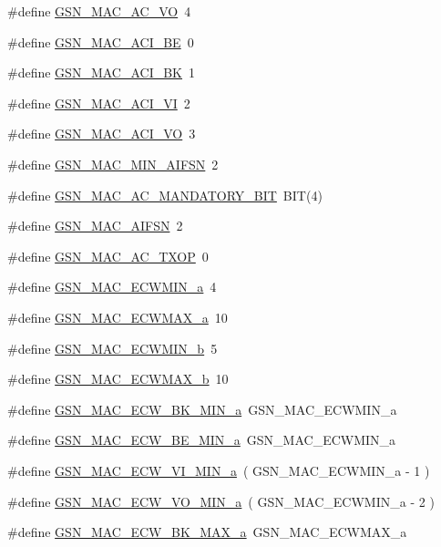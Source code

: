 \begin{DoxyCompactItemize}
\item 
\#define \hyperlink{a00523_a4de3fa81752356dc23b5990b02a54513}{GSN\_\-MAC\_\-AC\_\-VO}~4
\item 
\#define \hyperlink{a00523_a883b55372dade601837db81c6f59bdd7}{GSN\_\-MAC\_\-ACI\_\-BE}~0
\item 
\#define \hyperlink{a00523_a97a58aa6ea6e5a9bed57639a304055c0}{GSN\_\-MAC\_\-ACI\_\-BK}~1
\item 
\#define \hyperlink{a00523_a532c477c2671eb5baf4b3bbdf44ed128}{GSN\_\-MAC\_\-ACI\_\-VI}~2
\item 
\#define \hyperlink{a00523_a432cc7cfe39a06339138bb0c2ee23414}{GSN\_\-MAC\_\-ACI\_\-VO}~3
\item 
\#define \hyperlink{a00523_aa45c6a564699d30eb1af3fb2d4198c31}{GSN\_\-MAC\_\-MIN\_\-AIFSN}~2
\item 
\#define \hyperlink{a00523_a1c71cb54172b199e60a9a3b0da640ab7}{GSN\_\-MAC\_\-AC\_\-MANDATORY\_\-BIT}~BIT(4)
\item 
\#define \hyperlink{a00523_a07e8002fde89ed9897cf2813166f78ff}{GSN\_\-MAC\_\-AIFSN}~2
\item 
\#define \hyperlink{a00523_a7cffb6f566c0d5eec41b1435c9bd6756}{GSN\_\-MAC\_\-AC\_\-TXOP}~0
\item 
\#define \hyperlink{a00523_a822a28c535999f8d55e1606d143f94c3}{GSN\_\-MAC\_\-ECWMIN\_\-a}~4
\item 
\#define \hyperlink{a00523_a32d686ffde6f4e70e74f8140cc8924c2}{GSN\_\-MAC\_\-ECWMAX\_\-a}~10
\item 
\#define \hyperlink{a00523_a8d1ff390802f250fa0952bcf1a9f7e82}{GSN\_\-MAC\_\-ECWMIN\_\-b}~5
\item 
\#define \hyperlink{a00523_a91964a102ed95613ab71d8a3cd80337f}{GSN\_\-MAC\_\-ECWMAX\_\-b}~10
\item 
\#define \hyperlink{a00523_a256723c789a2a4cda860226654a93793}{GSN\_\-MAC\_\-ECW\_\-BK\_\-MIN\_\-a}~GSN\_\-MAC\_\-ECWMIN\_\-a
\item 
\#define \hyperlink{a00523_a9e518b7c55c5acfb47e72b5e6dd0216b}{GSN\_\-MAC\_\-ECW\_\-BE\_\-MIN\_\-a}~GSN\_\-MAC\_\-ECWMIN\_\-a
\item 
\#define \hyperlink{a00523_a98024fbca5c5a27cfbb9838b6359ecf2}{GSN\_\-MAC\_\-ECW\_\-VI\_\-MIN\_\-a}~( GSN\_\-MAC\_\-ECWMIN\_\-a -\/ 1 )
\item 
\#define \hyperlink{a00523_a339af19601a6713ca3914f8f4f5cfca3}{GSN\_\-MAC\_\-ECW\_\-VO\_\-MIN\_\-a}~( GSN\_\-MAC\_\-ECWMIN\_\-a -\/ 2 )
\item 
\#define \hyperlink{a00523_a67fe1d9c2afff7c9c2690b3248950061}{GSN\_\-MAC\_\-ECW\_\-BK\_\-MAX\_\-a}~GSN\_\-MAC\_\-ECWMAX\_\-a

\end{DoxyCompactItemize}
